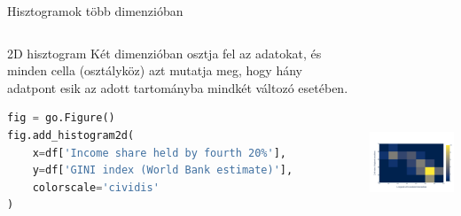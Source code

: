 \documentclass[english, aspectratio=169]{beamer}
\begin{document}
\begin{frame}[fragile]{Hisztogramok több dimenzióban}
	\begin{columns}
		\begin{column}{.5\textwidth}
			\begin{block}{2D hisztogram}
				Két dimenzióban osztja fel az adatokat, és minden cella (osztályköz) azt mutatja meg, hogy hány adatpont esik az adott tartományba mindkét változó esetében. 
			\end{block}
			\begin{lstlisting}[language=python]
fig = go.Figure()
fig.add_histogram2d(
	x=df['Income share held by fourth 20%'],
	y=df['GINI index (World Bank estimate)'],
	colorscale='cividis'
)
			\end{lstlisting}
		\end{column}
		\begin{column}{.5\textwidth}
			\begin{center}
				\includegraphics[width=7cm, height=7cm, keepaspectratio]{images/freq_11.png}
			\end{center}
		\end{column}
	\end{columns}
\end{frame}
\end{document}
